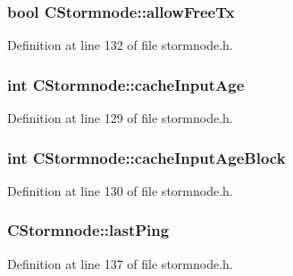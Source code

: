 \subsubsection[{allow\+Free\+Tx}]{\setlength{\rightskip}{0pt plus 5cm}bool C\+Stormnode\+::allow\+Free\+Tx}\label{class_c_stormnode_a1d256b346d4bee1e4d7a68db4c5e659f}


Definition at line 132 of file stormnode.\+h.

\hypertarget{class_c_stormnode_a60687ff2b6a277680c6d39eeee997532}{}
\subsubsection[{cache\+Input\+Age}]{\setlength{\rightskip}{0pt plus 5cm}int C\+Stormnode\+::cache\+Input\+Age}\label{class_c_stormnode_a60687ff2b6a277680c6d39eeee997532}


Definition at line 129 of file stormnode.\+h.

\hypertarget{class_c_stormnode_a80c11846fa792eb8466a37881b0c4954}{}
\subsubsection[{cache\+Input\+Age\+Block}]{\setlength{\rightskip}{0pt plus 5cm}int C\+Stormnode\+::cache\+Input\+Age\+Block}\label{class_c_stormnode_a80c11846fa792eb8466a37881b0c4954}


Definition at line 130 of file stormnode.\+h.

\hypertarget{class_c_stormnode_a506923ff67bd06fefba3a897828ce892}{}
\subsubsection[{last\+Ping}]{ C\+Stormnode\+::last\+Ping}\label{class_c_stormnode_a506923ff67bd06fefba3a897828ce892}


Definition at line 137 of file stormnode.\+h.

\hypertarget{class_c_stormnode_a632651553ac07fe57ceea55049eb430f}{}
